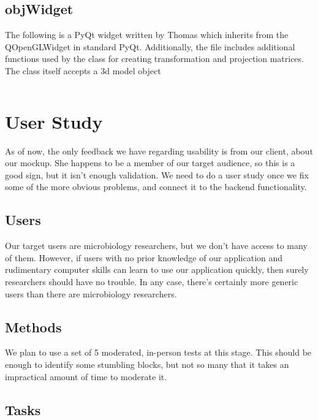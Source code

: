 \documentclass[letterpaper,10pt, onecolumn]{IEEEtran}
\begin{document}
\inputminted{python}{../../code/FaceView/fvParser.py}

\subsection*{objWidget} 

The following is a PyQt widget written by Thomas which inherits from the QOpenGLWidget in standard PyQt. Additionally, the file includes additional functions used by the class for creating transformation and projection matrices. The class itself accepts a 3d model object

\inputminted{python}{../../code/FaceView/objViewer/objWindow.py}

\section*{User Study}

As of now, the only feedback we have regarding usability is from our client, about our mockup. She happens to be a member of our target audience, so this is a good sign, but it isn't enough validation. We need to do a user study once we fix some of the more obvious problems, and connect it to the backend functionality.

\subsection*{Users}

Our target users are microbiology researchers, but we don't have access to many of them. However, if users with no prior knowledge of our application and rudimentary computer skills can learn to use our application quickly, then surely researchers should have no trouble. In any case, there's certainly more generic users than there are microbiology researchers.

\subsection*{Methods}

We plan to use a set of 5 moderated, in-person tests at this stage. This should be enough to identify some stumbling blocks, but not so many that it takes an impractical amount of time to moderate it.

\subsection*{Tasks}
\end{document}

